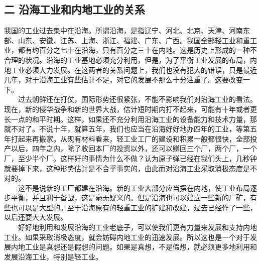 \documentclass[cn,11pt,chinese]{elegantbook}
\def\myformat#1{\hfil\hfil #1}
\begin{document}
\subsection*{\myformat{二 沿海工业和内地工业的关系}}
我国的工业过去集中在沿海。所谓沿海，是指辽宁、河北、北京、天津、河南东部、山东、安徽、江苏、上海、浙江、福建、广东、广西。我国全部轻工业和重工业，都有约百分之七十在沿海，只有百分之三十在内地。这是历史上形成的一种不合理的状况。沿海的工业基地必须充分利用，但是，为了平衡工业发展的布局，内地工业必须大力发展。在这两者的关系问题上，我们也没有犯大的错误，只是最近几年，对于沿海工业有些估计不足，对它的发展不那么十分注重了。这要改变一下。\\
　　过去朝鲜还在打仗，国际形势还很紧张，不能不影响我们对沿海工业的看法。现在，新的侵华战争和新的世界大战，估计短时期内打不起来，可能有十年或者更长一点的和平时期。这样，如果还不充分利用沿海工业的设备能力和技术力量，那就不对了。不说十年，就算五年，我们也应当在沿海好好地办四年的工业，等第五年打起来再搬家。从现有材料看来，轻工业工厂的建设和积累一般都很快，全部投产以后，四年之内，除了收回本厂的投资以外，还可以赚回三个厂，两个厂，一个厂，至少半个厂。这样好的事情为什么不做？认为原子弹已经在我们头上，几秒钟就要掉下来，这种形势估计是不合乎事实的，由此而对沿海工业采取消极态度是不对的。\\
　　这不是说新的工厂都建在沿海。新的工业大部分应当摆在内地，使工业布局逐步平衡，并且利于备战，这是毫无疑义的。但是沿海也可以建立一些新的厂矿，有些也可以是大型的。至于沿海原有的轻重工业的扩建和改建，过去已经作了一些，以后还要大大发展。\\
　　好好地利用和发展沿海的工业老底子，可以使我们更有力量来发展和支持内地工业。如果采取消极态度，就会妨碍内地工业的迅速发展。所以这也是一个对于发展内地工业是真想还是假想的问题。如果是真想，不是假想，就必须更多地利用和发展沿海工业，特别是轻工业。\\
\end{document}
